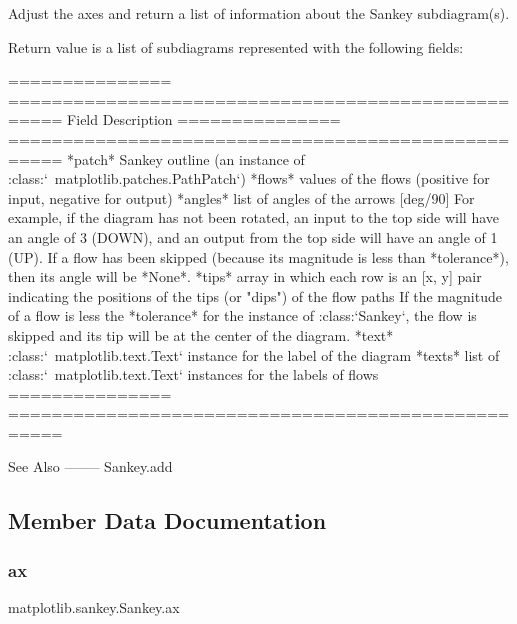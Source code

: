\begin{DoxyVerb}Adjust the axes and return a list of information about the Sankey
subdiagram(s).

Return value is a list of subdiagrams represented with the following
fields:

  ===============   ===================================================
  Field             Description
  ===============   ===================================================
  *patch*           Sankey outline (an instance of
            :class:`~matplotlib.patches.PathPatch`)
  *flows*           values of the flows (positive for input, negative
            for output)
  *angles*          list of angles of the arrows [deg/90]
            For example, if the diagram has not been rotated,
            an input to the top side will have an angle of 3
            (DOWN), and an output from the top side will have
            an angle of 1 (UP).  If a flow has been skipped
            (because its magnitude is less than *tolerance*),
            then its angle will be *None*.
  *tips*            array in which each row is an [x, y] pair
            indicating the positions of the tips (or "dips") of
            the flow paths
            If the magnitude of a flow is less the *tolerance*
            for the instance of :class:`Sankey`, the flow is
            skipped and its tip will be at the center of the
            diagram.
  *text*            :class:`~matplotlib.text.Text` instance for the
            label of the diagram
  *texts*           list of :class:`~matplotlib.text.Text` instances
            for the labels of flows
  ===============   ===================================================

See Also
--------
Sankey.add
\end{DoxyVerb}
 

\subsection{Member Data Documentation}
\mbox{\label{classmatplotlib_1_1sankey_1_1Sankey_af65ce4aa30db6f202bab576b9e00371d}} 
\subsubsection{\texorpdfstring{ax}{ax}}
{\footnotesize\ttfamily matplotlib.\+sankey.\+Sankey.\+ax}

